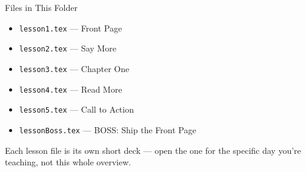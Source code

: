 \documentclass[aspectratio=169]{beamer}
\begin{document}
\begin{frame}{Files in This Folder}
    \small
    \begin{itemize}
        \item \texttt{lesson1.tex} --- Front Page
        \item \texttt{lesson2.tex} --- Say More
        \item \texttt{lesson3.tex} --- Chapter One
        \item \texttt{lesson4.tex} --- Read More
        \item \texttt{lesson5.tex} --- Call to Action
        \item \texttt{lessonBoss.tex} --- BOSS: Ship the Front Page
    \end{itemize}
    \vspace{0.5em}
    \normalsize Each lesson file is its own short deck --- open the one for
    the specific day you're teaching, not this whole overview.
\end{frame}
\end{document}
